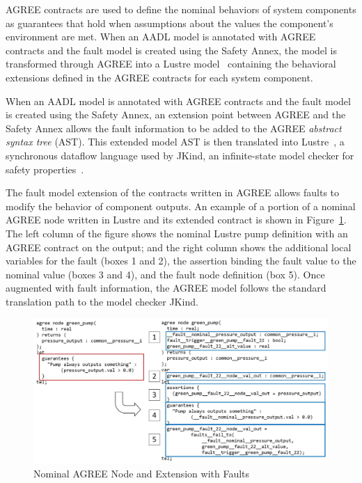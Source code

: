 AGREE contracts are used to define the nominal behaviors of system components as guarantees that hold when assumptions about the values the component's environment are met. When an AADL model is annotated with AGREE contracts and the fault model is created using the Safety Annex, the model is transformed through AGREE into a Lustre model~\cite{Halbwachs91:IEEE} containing the behavioral extensions defined in the AGREE contracts for each system component. 

When an AADL model is annotated with AGREE contracts and the fault model is created using the Safety Annex, an extension point between AGREE and the Safety Annex allows the fault information to be added to the AGREE \textit{abstract syntax tree} (AST). This extended model AST is then translated into Lustre~\cite{Halbwachs91:IEEE}, a synchronous dataflow language used by JKind, an infinite-state model checker for safety properties~\cite{2017arXiv171201222G}. 

The fault model extension of the contracts written in AGREE allows faults to modify the behavior of component outputs. An example of a portion of a nominal AGREE node written in Lustre and its extended contract is shown in Figure~\ref{fig:lustre}. The left column of the figure shows the nominal Lustre pump definition with an AGREE contract on the output; and the right column shows the additional local variables for the fault (boxes 1 and 2), the assertion binding the fault value to the nominal value (boxes 3 and 4), and the fault node definition (box 5). Once augmented with fault information, the AGREE model follows the standard translation path to the model checker JKind. 

\begin{figure}[h!]
	\hspace*{-2cm}
	\begin{center}
		\includegraphics[scale=0.3]{images/lustre.jpg}
		\caption{Nominal AGREE Node and Extension with Faults}
		\label{fig:lustre}
	\end{center}
\end{figure}


